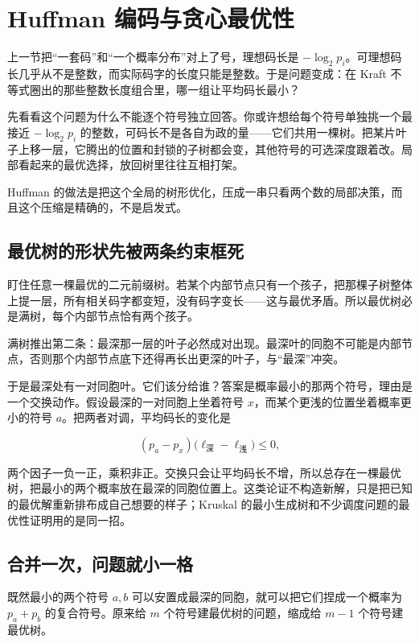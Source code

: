 \section{Huffman 编码与贪心最优性}
\label{sec:07-Information-Theory/04-Source-Coding/02}

上一节把``一套码''和``一个概率分布''对上了号，理想码长是 \(-\log_2 p_i\)。可理想码长几乎从不是整数，而实际码字的长度只能是整数。于是问题变成：在 Kraft 不等式圈出的那些整数长度组合里，哪一组让平均码长最小？

先看看这个问题为什么不能逐个符号独立回答。你或许想给每个符号单独挑一个最接近 \(-\log_2 p_i\) 的整数，可码长不是各自为政的量——它们共用一棵树。把某片叶子上移一层，它腾出的位置和封锁的子树都会变，其他符号的可选深度跟着改。局部看起来的最优选择，放回树里往往互相打架。

Huffman 的做法是把这个全局的树形优化，压成一串只看两个数的局部决策，而且这个压缩是精确的，不是启发式。

\subsection{最优树的形状先被两条约束框死}

盯住任意一棵最优的二元前缀树。若某个内部节点只有一个孩子，把那棵子树整体上提一层，所有相关码字都变短，没有码字变长——这与最优矛盾。所以最优树必是满树，每个内部节点恰有两个孩子。

满树推出第二条：最深那一层的叶子必然成对出现。最深叶的同胞不可能是内部节点，否则那个内部节点底下还得再长出更深的叶子，与``最深''冲突。

于是最深处有一对同胞叶。它们该分给谁？答案是概率最小的那两个符号，理由是一个交换动作。假设最深的一对同胞上坐着符号 \(x\)，而某个更浅的位置坐着概率更小的符号 \(a\)。把两者对调，平均码长的变化是

\[
(p_a-p_x)\bigl(\ell_{\text{深}}-\ell_{\text{浅}}\bigr)\le 0,
\]

两个因子一负一正，乘积非正。交换只会让平均码长不增，所以总存在一棵最优树，把最小的两个概率放在最深的同胞位置上。这类论证不构造新解，只是把已知的最优解重新排布成自己想要的样子；Kruskal 的最小生成树和不少调度问题的最优性证明用的是同一招。

\subsection{合并一次，问题就小一格}

既然最小的两个符号 \(a,b\) 可以安置成最深的同胞，就可以把它们捏成一个概率为 \(p_a+p_b\) 的复合符号。原来给 \(m\) 个符号建最优树的问题，缩成给 \(m-1\) 个符号建最优树。

